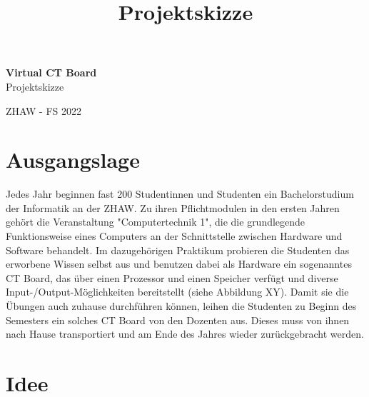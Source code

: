 \documentclass[10pt]{article}
\title{Projektskizze}
\begin{document}
\begin{titlepage}

\raggedleft %
	
	\vspace*{\baselineskip} %
	
	
	\vspace*{0.167\textheight} %
	
	\textbf{\LARGE Virtual CT Board}\\[\baselineskip] %
	
	\Huge Projektskizze\\[\baselineskip] %
	
	\vfill %
	
	{\large ZHAW - FS 2022}
	
	\vspace*{3\baselineskip} %


\end{titlepage}

\tableofcontents

\newpage 

\section{Ausgangslage}

Jedes Jahr beginnen fast 200 Studentinnen und Studenten ein Bachelorstudium der Informatik an der ZHAW. Zu ihren Pflichtmodulen in den ersten Jahren gehört die Veranstaltung "Computertechnik 1", die die grundlegende Funktionsweise eines Computers an der Schnittstelle zwischen Hardware und Software behandelt. Im dazugehörigen Praktikum probieren die Studenten das erworbene Wissen selbst aus und benutzen dabei als Hardware ein sogenanntes CT Board, das über einen Prozessor und einen Speicher verfügt und diverse Input-/Output-Möglichkeiten bereitstellt (siehe Abbildung XY). Damit sie die Übungen auch zuhause durchführen können, leihen die Studenten zu Beginn des Semesters ein solches CT Board von den Dozenten aus. Dieses muss von ihnen nach Hause transportiert und am Ende des Jahres wieder zurückgebracht werden.

\section{Idee}
\end{document}
